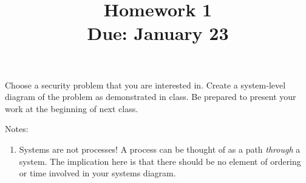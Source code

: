 \documentclass[11pt]{article}
\title{Homework 1 \\ Due: January 23}
\author{}
\begin{document}
\maketitle

Choose a security problem that you are interested in. Create a system-level diagram of the problem as demonstrated in class. Be prepared to present your work at the beginning of next class.

Notes:
\begin{enumerate}
    \item Systems are not processes! A process can be thought of as a path {\it through} a system. The implication here is that there should be no element of ordering or time involved in your systems diagram.
\end{enumerate}
\end{document}
